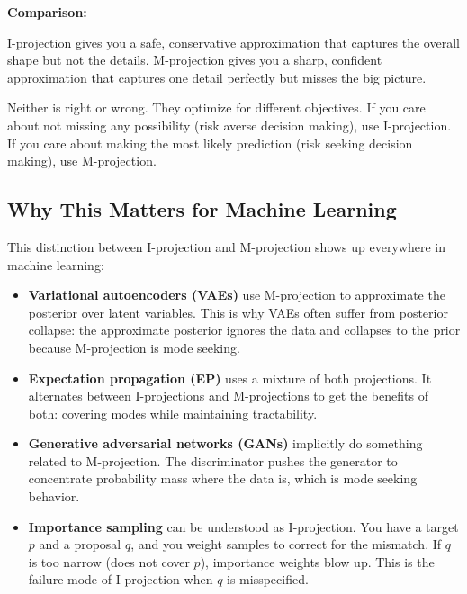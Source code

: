 \begin{examplebox}
\vspace{0.5em}

\textbf{Comparison:}

I-projection gives you a safe, conservative approximation that captures the overall shape but not the details. M-projection gives you a sharp, confident approximation that captures one detail perfectly but misses the big picture.

Neither is right or wrong. They optimize for different objectives. If you care about not missing any possibility (risk averse decision making), use I-projection. If you care about making the most likely prediction (risk seeking decision making), use M-projection.
\end{examplebox}

\vspace{1.5em}

\subsection{Why This Matters for Machine Learning}

This distinction between I-projection and M-projection shows up everywhere in machine learning:

\begin{itemize}
\item \textbf{Variational autoencoders (VAEs)} use M-projection to approximate the posterior over latent variables. This is why VAEs often suffer from posterior collapse: the approximate posterior ignores the data and collapses to the prior because M-projection is mode seeking.

\item \textbf{Expectation propagation (EP)} uses a mixture of both projections. It alternates between I-projections and M-projections to get the benefits of both: covering modes while maintaining tractability.

\item \textbf{Generative adversarial networks (GANs)} implicitly do something related to M-projection. The discriminator pushes the generator to concentrate probability mass where the data is, which is mode seeking behavior.

\item \textbf{Importance sampling} can be understood as I-projection. You have a target $p$ and a proposal $q$, and you weight samples to correct for the mismatch. If $q$ is too narrow (does not cover $p$), importance weights blow up. This is the failure mode of I-projection when $q$ is misspecified.
\end{itemize}

